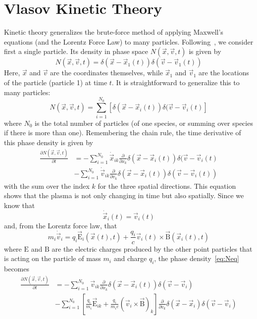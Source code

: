 \section{Vlasov Kinetic Theory} \label{sec:vlasov}
Kinetic theory generalizes the brute-force method of applying Maxwell's equations (and the Lorentz Force Law) to many particles. Following~\citet{Nicholson1983}, we consider first a single particle. Its density in phase space $N(\vec x,\vec v,t)$ is given by
\begin{equation*}
  N(\vec x,\vec v,t)=\delta(\vec x-\vec x_1(t))\delta(\vec v-\vec v_1(t))
\end{equation*}
Here, $\vec x$ and $\vec v$ are the coordinates themselves, while $\vec x_1$ and $\vec v_1$ are the locations of the particle (particle 1) at time $t$. It is straightforward to generalize this to many particles:
\begin{equation*}
  N(\vec x,\vec v,t)=\sum_{i=1}^{N_0} \left[\delta(\vec x-\vec x_i(t))\delta(\vec v-\vec v_i(t)\right]
\end{equation*}
where $N_0$ is the total number of particles (of one species, or summing over species if there is more than one). Remembering the chain rule, the time derivative of this phase density is given by
\begin{align}
  \frac{\partial N(\vec x,\vec v,t)}{\partial t}&=-\sum_{i=1}^{N_0} \dot{\vec x}_{ik} \frac{\partial}{\partial x_k}\delta(\vec x-\vec x_i(t))\delta(\vec v-\vec v_i(t)\nonumber\\
  &-\sum_{i=1}^{N_0} \dot{\vec v}_{ik}\frac{\partial}{\partial v_k}\delta(\vec x-\vec x_i(t))\delta(\vec v-\vec v_i(t))\label{eq:Neq}
\end{align}
with the sum over the index $k$ for the three spatial directions. This equation shows that the plasma is not only changing in time but also spatially. Since we know that
\begin{equation*}
  \dot{\vec x}_i(t)=\vec v_i(t)
\end{equation*}
and, from the Lorentz force law, that
\begin{equation*}
  m_i\dot{\vec v}_i=q_i \vec{\mathrm{E}}_i(\vec x(t),t)+\frac{q_i}{c}\vec v_i(t)\times\vec{\mathrm{B}}(\vec x_i(t),t)
\end{equation*}
where $\mathrm{E}$ and $\mathrm{B}$ are the electric charges produced by the other point particles that is acting on the particle of mass $m_i$ and charge $q_i$, the phase density~\ref{eq:Neq} becomes
\begin{align*}
  \frac{\partial N(\vec x,\vec v,t)}{\partial t}&=-\sum_{i=1}^{N_0} \vec v_{ik}\frac{\partial}{\partial x_k} \delta(\vec x-\vec x_i(t))\delta(\vec v-\vec v_i)\\
  &-\sum_{i=1}^{N_0} \left[\frac{q_i}{m_i}\vec{\mathrm{E}}_{ik}+\frac{q_i}{m_i c}(\vec v_i\times\vec{\mathrm{B}})_k\right]\frac{\partial}{\partial v_k}\delta(\vec x-\vec x_i)\delta(\vec v-\vec v_i)
\end{align*}
